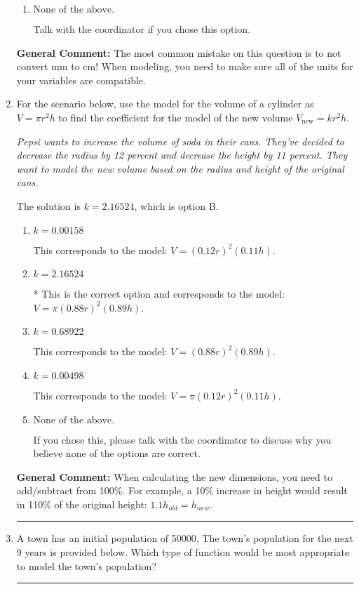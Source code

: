 \documentclass{extbook}[14pt]
\newcommand{\litem}[1]{\item #1

\rule{\textwidth}{0.4pt}}
\begin{document}
\begin{enumerate}
{\begin{enumerate}[label=\Alph*.]
This option uses the correct model, $R = \frac{k}{l^{4}}$, but does not convert from mm to cm so that the units match.
\item \( \text{None of the above.} \)

Talk with the coordinator if you chose this option.
\end{enumerate}

\textbf{General Comment:} The most common mistake on this question is to not convert mm to cm! When modeling, you need to make sure all of the units for your variables are compatible.
}
\litem{
For the scenario below, use the model for the volume of a cylinder as $V = \pi r^2 h$ to find the coefficient for the model of the new volume $V_{\text{new}} = k r^2 h$.

\begin{center}
    \textit{ Pepsi wants to increase the volume of soda in their cans. They've decided to decrease the radius by 12 percent and decrease the height by 11 percent. They want to model the new volume based on the radius and height of the original cans. }
\end{center}
The solution is \( k = 2.16524 \), which is option B.\begin{enumerate}[label=\Alph*.]
\item \( k = 0.00158 \)

This corresponds to the model: $V = (0.12 r)^2 (0.11 h)$.
\item \( k = 2.16524 \)

* This is the correct option and corresponds to the model: $V = \pi (0.88 r)^2 (0.89 h)$.
\item \( k = 0.68922 \)

This corresponds to the model: $V = (0.88 r)^2 (0.89 h)$.
\item \( k = 0.00498 \)

This corresponds to the model: $V = \pi (0.12 r)^2 (0.11 h)$.
\item \( \text{None of the above.} \)

If you chose this, please talk with the coordinator to discuss why you believe none of the options are correct.
\end{enumerate}

\textbf{General Comment:} When calculating the new dimensions, you need to add/subtract from 100\%. For example, a 10\% increase in height would result in 110\% of the original height: $1.1h_{old} = h_{new}$.
}
\litem{
A town has an initial population of 50000. The town's population for the next 9 years is provided below. Which type of function would be most appropriate to model the town's population?


}
\end{enumerate}
\end{document}

